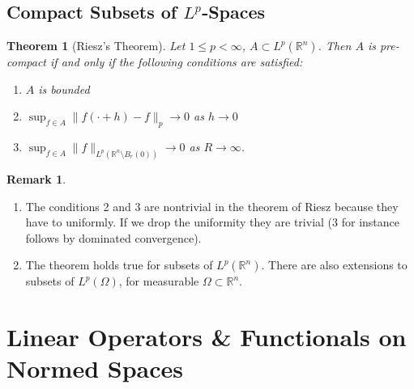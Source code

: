 \documentclass[11pt,a4paper]{article}
\newtheorem{thm}{Theorem}[section]
\theoremstyle{definition}
\newtheorem{rem}{Remark}[section]
\begin{document}
\subsection{Compact Subsets of $L^p$-Spaces}
\begin{thm}[Riesz's Theorem] Let $1 \leq p < \infty$, $A \subset L^p( \mathbb{R}^n)$. Then $A$ is pre-compact if and only if the following conditions are satisfied:
\begin{enumerate}
\item $A$ is bounded 
\item $\displaystyle \sup_{f \in A} \|f( \cdot + h) -f \|_p \to 0$ as $h \to 0$
\item $\displaystyle \sup_{f \in A} \|f\|_{L^p( \mathbb{R}^n \setminus B_r(0)) } \to 0$ as $R \to \infty$.
\end{enumerate}
\end{thm}
\begin{rem} \  \begin{enumerate}
\item The conditions 2 and 3 are nontrivial in the theorem of Riesz because they have to uniformly. If we drop the uniformity they are trivial (3 for instance follows by dominated convergence). 
\item The theorem holds true for subsets of $L^p( \mathbb{R}^n)$. There are also extensions to subsets of $L^p( \Omega)$, for measurable $\Omega \subset \mathbb{R}^n$. 
\end{enumerate} 
\end{rem}
\newpage
\section{Linear Operators \& Functionals on Normed Spaces}
\end{document}
